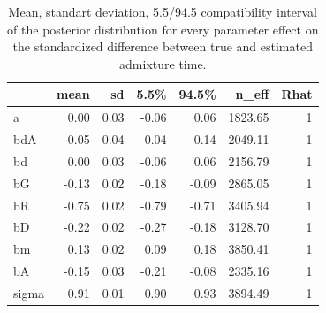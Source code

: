 \documentclass[11pt]{article}
\begin{document}
\begin{table}[H]

\caption{\label{tab:tableS1_2}\label{tab:tableS1} Mean, standart deviation, 5.5/94.5 compatibility interval of the posterior distribution for every parameter effect on the standardized difference between true and estimated admixture time.}
\centering
\begin{tabular}[t]{l|r|r|r|r|r|r}
\hline
  & mean & sd & 5.5\% & 94.5\% & n\_eff & Rhat\\
\hline
a & 0.00 & 0.03 & -0.06 & 0.06 & 1823.65 & 1\\
\cline{1-7}
bdA & 0.05 & 0.04 & -0.04 & 0.14 & 2049.11 & 1\\
\cline{1-7}
bd & 0.00 & 0.03 & -0.06 & 0.06 & 2156.79 & 1\\
\cline{1-7}
bG & -0.13 & 0.02 & -0.18 & -0.09 & 2865.05 & 1\\
\cline{1-7}
bR & -0.75 & 0.02 & -0.79 & -0.71 & 3405.94 & 1\\
\cline{1-7}
bD & -0.22 & 0.02 & -0.27 & -0.18 & 3128.70 & 1\\
\cline{1-7}
bm & 0.13 & 0.02 & 0.09 & 0.18 & 3850.41 & 1\\
\cline{1-7}
bA & -0.15 & 0.03 & -0.21 & -0.08 & 2335.16 & 1\\
\cline{1-7}
sigma & 0.91 & 0.01 & 0.90 & 0.93 & 3894.49 & 1\\
\hline
\end{tabular}
\end{table}
\end{document}
